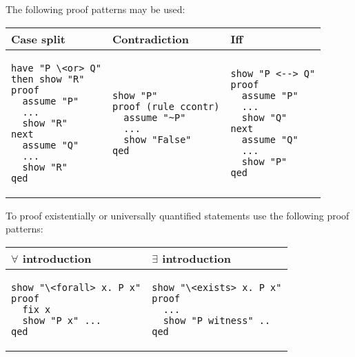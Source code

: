 \documentclass{article}
\begin{document}
\begin{definition}
	The following proof patterns may be used:
	\begin{center}
		\begin{tabular}{l | l | l }
			\textbf{Case split}                 &
			\textbf{Contradiction}              &
			\textbf{Iff}                          \\
			\hline
			\begin{minipage}[t]{0.25\textwidth}
				\begin{verbatim}
have "P \<or> Q"
then show "R"
proof
  assume "P"
  ...
  show "R"
next
  assume "Q"
  ... 
  show "R"
qed
				\end{verbatim}
			\end{minipage} &
			\begin{minipage}[t]{0.25\textwidth}
				\begin{verbatim}
show "P"
proof (rule ccontr)
  assume "~P"
  ...
  show "False"
qed
				\end{verbatim}
			\end{minipage} &
			\begin{minipage}[t]{0.25\textwidth}
				\begin{verbatim}
show "P <--> Q"
proof
  assume "P"
  ... 
  show "Q"
next
  assume "Q"
  ... 
  show "P"
qed
					\end{verbatim}
			\end{minipage}
		\end{tabular}
	\end{center}
\end{definition}

\begin{definition}
	To proof existentially or universally quantified statements
	use the following proof patterns:\par
	\begin{center}
		\begin{tabular}{l | l}
			\textbf{$\forall$ introduction}    &
			\textbf{$\exists$ introduction}      \\
			\hline
			\begin{minipage}[t]{0.4\textwidth}
				\begin{verbatim}
show "\<forall> x. P x"
proof
  fix x 
  show "P x" ...
qed
				\end{verbatim}
			\end{minipage} &
			\begin{minipage}[t]{0.4\textwidth}
				\begin{verbatim}
show "\<exists> x. P x"
proof
  ...
  show "P witness" ..
qed
				\end{verbatim}
			\end{minipage}
		\end{tabular}
	\end{center}
\end{definition}
\end{document}
